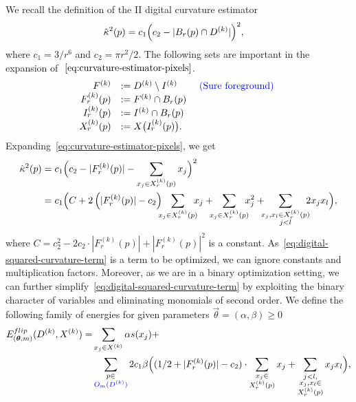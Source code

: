 We recall the definition of the II digital curvature estimator 
\begin{align}
	\hat{\kappa}^2(p) &= c_1\Big( c_2 - | B_r(p) \cap D^{(k)} | \Big)^2, 
	\label{eq:curvature-estimator-pixels}
\end{align}
where $c_1=3/r^6$ and $c_2=\pi r^2/2$. 
%
The following sets are important in the expansion of $~\cref{eq:curvature-estimator-pixels}$.
\begin{align*}
	\begin{array}{rll}
	F^{(k)} &:= D^{(k)} \setminus I^{(k)} & \text{ {\color{blue}{(Sure foreground) }}} \\
	F_r^{(k)}(p) &:= F^{(k)} \cap B_r(p) &\\
	I_r^{(k)}(p) &:= I^{(k)} \cap B_r(p) & \\
	X_r^{(k)}(p) &:= X\big( I_r^{(k)}(p) \big). & \\	
	\end{array}
\end{align*}
%
%
Expanding~\cref{eq:curvature-estimator-pixels}, we get 
\begin{align}
  \hat{\kappa}^2(p) &= c_1\Big( c_2 - |F_{r}^{(k)}(p)| - \sum_{x_j \in X_r^{(k)}(p)} {x_j} \Big)^2 \nonumber \\
   &= c_1 \Big( C + 2\left( |F_{r}^{(k)}(p)| - c_2 \right) \hspace{-2mm}\sum_{x_j \in X_{r}^{(k)}(p)}\hspace{-2mm}{x_j} + \hspace{-2mm}\sum_{x_j \in X_{r}^{(k)}(p)}\hspace{-2mm}{x_j^2} + \hspace{-2mm}\sum_{ \substack{x_j,x_l \in X_{r}^{(k)}(p) \\ j<l} }\hspace{-2mm}{2x_jx_l}  \Big),
   \label{eq:digital-squared-curvature-term}
\end{align}
where $C=c_2^2 - 2c_2 \cdot |F_{r}^{(k)}(p)| + |F_{r}^{(k)}(p)|^2$ is a constant. As~\cref{eq:digital-squared-curvature-term} is a term to be optimized, we can ignore constants and multiplication factors. Moreover, as we are in a binary optimization setting, we can  further simplify~\cref{eq:digital-squared-curvature-term} by exploiting the binary character of variables and eliminating monomials of second order. We define the following family
of energies for given parameters $\vec{\theta}=(\alpha,\beta ) \geq 0$
\begin{align}
  E_{(\bm{\theta},m)}^{flip}(D^{(k)},X^{(k)}) =& \sum_{x_j \in X^{(k)}}{\alpha s(x_j)} + \nonumber \\ 
  & \sum_{ \substack{p \in \\ {\color{blue}{O_m(D^{(k)})}}}}{ 2c_1 \beta  \Big( { (1/2+ |F_{r}^{(k)}(p)|-c_2) \cdot \sum_{ \substack{ x_j \in \\ X_{r}^{(k)}(p)}}{x_j} } + \sum_{ \substack{j<l, \\ x_j,x_l \in \\ X_{r}^{(k)}(p) } }{x_jx_l} \Big) },
  \label{eq:energy-family}
\end{align}
